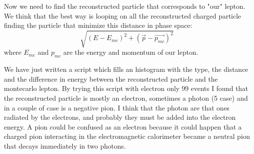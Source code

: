 Now we need to find the reconstructed particle that corresponds to "our" lepton. We think that the best way is looping on all the reconstructed charged particle finding the particle that minimize this distance in phase space:
\[ \sqrt{(E-E_{mc})^2 + (\vec{p}-\vec{p_{mc}})^2}\]
where $E_{mc}$ and $p_{mc}$ are the energy and momentum of our lepton.

We have just written a script which fills an histogram with the type, the distance and the difference in energy between the reconstructed particle and the montecarlo lepton.
By trying this script with electron only 99 events I found that the reconstructed particle is mostly an electron, sometimes a photon (5 case) and in a couple of case is a negative pion. I think that the photon are that ones radiated by the electrons, and probably they must be added into the electron energy. A pion could be confused as an electron because it could happen that a charged pion interacting in the electromagnetic calorimeter became a neutral pion that decays immediately in two photons.